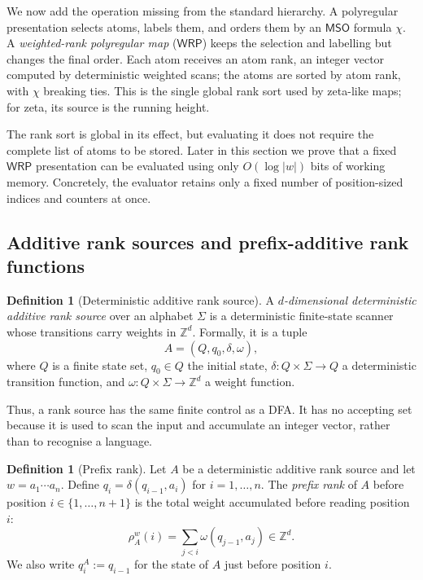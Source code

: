 \documentclass[11pt]{article}
\theoremstyle{definition}
\newtheorem{definition}[theorem]{Definition}
\newcommand{\Z}{\mathbb Z}
\newcommand{\WRP}{\mathsf{WRP}}
\newcommand{\MSO}{\mathsf{MSO}}
\begin{document}
We now add the operation missing from the standard hierarchy.  A polyregular
presentation selects atoms, labels them, and orders them by an $\MSO$
formula $\chi$.  A \emph{weighted-rank polyregular map} ($\WRP$) keeps the
selection and labelling but changes the final order.  Each atom receives an
atom rank, an integer vector computed by deterministic weighted scans; the atoms are
sorted by atom rank, with $\chi$ breaking ties.  This is the single global rank
sort used by zeta-like maps; for zeta, its source is the running height.

The rank sort is global in its effect, but evaluating it does not require the
complete list of atoms to be stored.  Later in this section we prove that a
fixed $\WRP$ presentation can be evaluated using only $O(\log |w|)$ bits of
working memory.  Concretely, the evaluator retains only a fixed number of
position-sized indices and counters at once.

\subsection{Additive rank sources and prefix-additive rank functions}

\begin{definition}[Deterministic additive rank source]
\label{def:rank-source}
A \emph{$d$-dimensional deterministic additive rank source} over an alphabet
$\Sigma$ is a deterministic finite-state scanner whose transitions carry
weights in $\Z^d$.  Formally, it is a tuple
\[
   A=(Q,q_0,\delta,\omega),
\]
where $Q$ is a finite state set, $q_0\in Q$ the initial state,
$\delta\colon Q\times\Sigma\to Q$ a deterministic transition function, and
$\omega\colon Q\times\Sigma\to\Z^d$ a weight function.
\end{definition}

Thus, a rank source has the same finite control as a DFA\@.  It has no accepting
set because it is used to scan the input and accumulate an integer vector,
rather than to recognise a language.

\begin{definition}[Prefix rank]\label{def:prefix-rank}
Let $A$ be a deterministic additive rank source and let
$w=a_1\cdots a_n$.  Define
$q_i=\delta(q_{i-1},a_i)$ for $i=1,\ldots,n$.  The \emph{prefix rank} of $A$
before position $i\in\{1,\ldots,n+1\}$ is the total weight accumulated before
reading position $i$:
\[
   \rho_A^w(i)=\sum_{j<i}\omega(q_{j-1},a_j)\in\Z^d.
\]
We also write $q^A_i:=q_{i-1}$ for the state of $A$ just before position $i$.
\end{definition}
\end{document}
